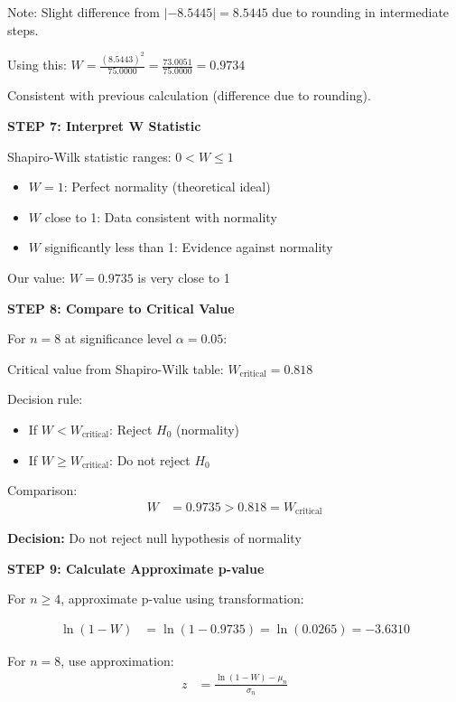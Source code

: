 \documentclass[12pt]{article}
\begin{document}
\begin{solution}
Note: Slight difference from $|{-8.5445}| = 8.5445$ due to rounding in intermediate steps.

Using this: $W = \frac{(8.5443)^2}{75.0000} = \frac{73.0051}{75.0000} = 0.9734$

Consistent with previous calculation (difference due to rounding).

\textbf{STEP 7: Interpret W Statistic}

Shapiro-Wilk statistic ranges: $0 < W \leq 1$

\begin{itemize}
\item $W = 1$: Perfect normality (theoretical ideal)
\item $W$ close to 1: Data consistent with normality
\item $W$ significantly less than 1: Evidence against normality
\end{itemize}

Our value: $W = 0.9735$ is very close to 1

\textbf{STEP 8: Compare to Critical Value}

For $n = 8$ at significance level $\alpha = 0.05$:

Critical value from Shapiro-Wilk table: $W_{\text{critical}} = 0.818$

Decision rule:
\begin{itemize}
\item If $W < W_{\text{critical}}$: Reject $H_0$ (normality)
\item If $W \geq W_{\text{critical}}$: Do not reject $H_0$
\end{itemize}

Comparison:
\begin{align*}
W &= 0.9735 > 0.818 = W_{\text{critical}}
\end{align*}

\textbf{Decision:} Do not reject null hypothesis of normality

\textbf{STEP 9: Calculate Approximate p-value}

For $n \geq 4$, approximate p-value using transformation:

\begin{align*}
\ln(1 - W) &= \ln(1 - 0.9735) = \ln(0.0265) = -3.6310
\end{align*}

For $n = 8$, use approximation:
\begin{align*}
z &= \frac{\ln(1-W) - \mu_n}{\sigma_n}
\end{align*}


\end{solution}
\end{document}
